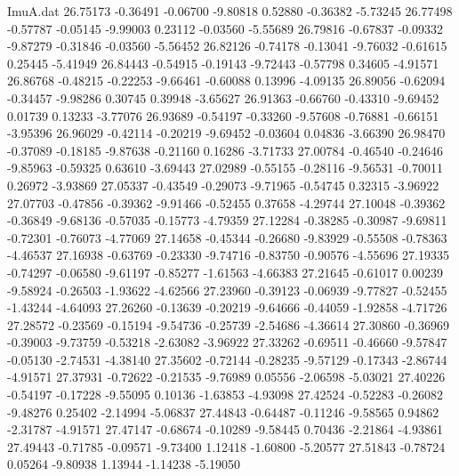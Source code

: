\begin{filecontents}{ImuA.dat}
  26.75173   -0.36491   -0.06700   -9.80818    0.52880   -0.36382   -5.73245
  26.77498   -0.57787   -0.05145   -9.99003    0.23112   -0.03560   -5.55689
  26.79816   -0.67837   -0.09332   -9.87279   -0.31846   -0.03560   -5.56452
  26.82126   -0.74178   -0.13041   -9.76032   -0.61615    0.25445   -5.41949
  26.84443   -0.54915   -0.19143   -9.72443   -0.57798    0.34605   -4.91571
  26.86768   -0.48215   -0.22253   -9.66461   -0.60088    0.13996   -4.09135
  26.89056   -0.62094   -0.34457   -9.98286    0.30745    0.39948   -3.65627
  26.91363   -0.66760   -0.43310   -9.69452    0.01739    0.13233   -3.77076
  26.93689   -0.54197   -0.33260   -9.57608   -0.76881   -0.66151   -3.95396
  26.96029   -0.42114   -0.20219   -9.69452   -0.03604    0.04836   -3.66390
  26.98470   -0.37089   -0.18185   -9.87638   -0.21160    0.16286   -3.71733
  27.00784   -0.46540   -0.24646   -9.85963   -0.59325    0.63610   -3.69443
  27.02989   -0.55155   -0.28116   -9.56531   -0.70011    0.26972   -3.93869
  27.05337   -0.43549   -0.29073   -9.71965   -0.54745    0.32315   -3.96922
  27.07703   -0.47856   -0.39362   -9.91466   -0.52455    0.37658   -4.29744
  27.10048   -0.39362   -0.36849   -9.68136   -0.57035   -0.15773   -4.79359
  27.12284   -0.38285   -0.30987   -9.69811   -0.72301   -0.76073   -4.77069
  27.14658   -0.45344   -0.26680   -9.83929   -0.55508   -0.78363   -4.46537
  27.16938   -0.63769   -0.23330   -9.74716   -0.83750   -0.90576   -4.55696
  27.19335   -0.74297   -0.06580   -9.61197   -0.85277   -1.61563   -4.66383
  27.21645   -0.61017    0.00239   -9.58924   -0.26503   -1.93622   -4.62566
  27.23960   -0.39123   -0.06939   -9.77827   -0.52455   -1.43244   -4.64093
  27.26260   -0.13639   -0.20219   -9.64666   -0.44059   -1.92858   -4.71726
  27.28572   -0.23569   -0.15194   -9.54736   -0.25739   -2.54686   -4.36614
  27.30860   -0.36969   -0.39003   -9.73759   -0.53218   -2.63082   -3.96922
  27.33262   -0.69511   -0.46660   -9.57847   -0.05130   -2.74531   -4.38140
  27.35602   -0.72144   -0.28235   -9.57129   -0.17343   -2.86744   -4.91571
  27.37931   -0.72622   -0.21535   -9.76989    0.05556   -2.06598   -5.03021
  27.40226   -0.54197   -0.17228   -9.55095    0.10136   -1.63853   -4.93098
  27.42524   -0.52283   -0.26082   -9.48276    0.25402   -2.14994   -5.06837
  27.44843   -0.64487   -0.11246   -9.58565    0.94862   -2.31787   -4.91571
  27.47147   -0.68674   -0.10289   -9.58445    0.70436   -2.21864   -4.93861
  27.49443   -0.71785   -0.09571   -9.73400    1.12418   -1.60800   -5.20577
  27.51843   -0.78724    0.05264   -9.80938    1.13944   -1.14238   -5.19050

\end{filecontents}

